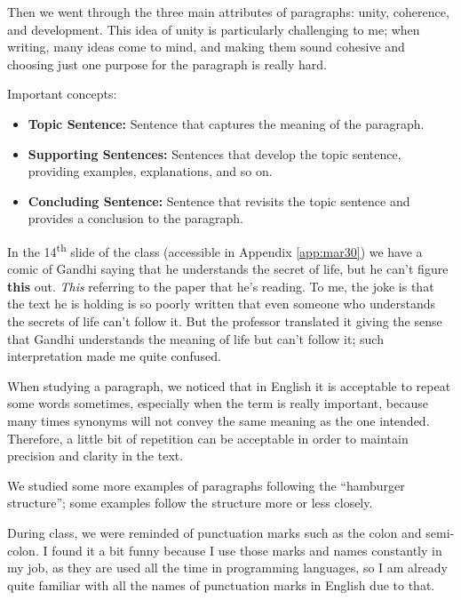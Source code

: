 Then we went through the three main attributes of paragraphs: unity, coherence, and development. This idea of unity is particularly challenging to me; when writing, many ideas come to mind, and making them sound cohesive and choosing just one purpose for the paragraph is really hard.

Important concepts:
\begin{itemize}
    \item \textbf{Topic Sentence:} Sentence that captures the meaning of the paragraph.
    \item \textbf{Supporting Sentences:} Sentences that develop the topic sentence, providing examples, explanations, and so on.
    \item \textbf{Concluding Sentence:} Sentence that revisits the topic sentence and provides a conclusion to the paragraph.
\end{itemize}

In the 14\textsuperscript{th} slide of the class (accessible in Appendix \ref{app:mar30}) we have a comic of Gandhi saying that he understands the secret of life, but he can't figure \textbf{this} out. \textit{This} referring to the paper that he's reading. To me, the joke is that the text he is holding is so poorly written that even someone who understands the secrets of life can't follow it. But the professor translated it giving the sense that Gandhi understands the meaning of life but can't follow it; such interpretation made me quite confused.

When studying a paragraph, we noticed that in English it is acceptable to repeat some words sometimes, especially when the term is really important, because many times synonyms will not convey the same meaning as the one intended. Therefore, a little bit of repetition can be acceptable in order to maintain precision and clarity in the text.

We studied some more examples of paragraphs following the ``hamburger structure''; some examples follow the structure more or less closely.

During class, we were reminded of punctuation marks such as the colon and semi-colon. I found it a bit funny because I use those marks and names constantly in my job, as they are used all the time in programming languages, so I am already quite familiar with all the names of punctuation marks in English due to that.
